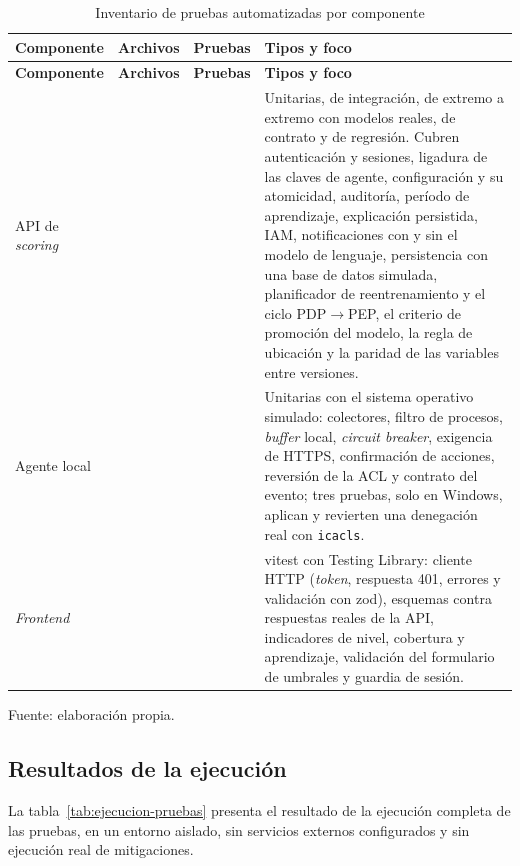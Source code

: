 \begin{longtable}{>{\raggedright\arraybackslash}p{2.6cm}>{\raggedright\arraybackslash}p{1.9cm}>{\raggedright\arraybackslash}p{1.9cm}>{\raggedright\arraybackslash}p{7.5cm}}
	\caption{Inventario de pruebas automatizadas por componente}
	\label{tab:inventario-pruebas}\\
	\hline
	\textbf{Componente} & \textbf{Archivos} & \textbf{Pruebas} & \textbf{Tipos y foco} \\
	\hline
	\endfirsthead
	\hline
	\textbf{Componente} & \textbf{Archivos} & \textbf{Pruebas} & \textbf{Tipos y foco} \\
	\hline
	\endhead
	API de \emph{scoring} & 56 & 563 & Unitarias, de integración, de extremo a extremo con modelos reales, de contrato y de regresión. Cubren autenticación y sesiones, ligadura de las claves de agente, configuración y su atomicidad, auditoría, período de aprendizaje, explicación persistida, IAM, notificaciones con y sin el modelo de lenguaje, persistencia con una base de datos simulada, planificador de reentrenamiento y el ciclo PDP$\rightarrow$PEP, el criterio de promoción del modelo, la regla de ubicación y la paridad de las variables entre versiones. \\
	\hline
	Agente local & 17 & 203 & Unitarias con el sistema operativo simulado: colectores, filtro de procesos, \emph{buffer} local, \emph{circuit breaker}, exigencia de HTTPS, confirmación de acciones, reversión de la ACL y contrato del evento; tres pruebas, solo en Windows, aplican y revierten una denegación real con \texttt{icacls}. \\
	\hline
	\emph{Frontend} & 5 & 35 & vitest con Testing Library: cliente HTTP (\emph{token}, respuesta 401, errores y validación con zod), esquemas contra respuestas reales de la API, indicadores de nivel, cobertura y aprendizaje, validación del formulario de umbrales y guardia de sesión. \\
	\hline
\end{longtable}
{\small Fuente: elaboración propia.\par}

\subsection{Resultados de la ejecución}
La tabla~\ref{tab:ejecucion-pruebas} presenta el resultado de la ejecución completa de las pruebas, en un entorno aislado, sin servicios externos configurados y sin ejecución real de mitigaciones.

